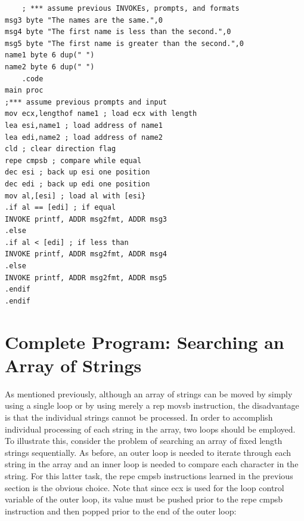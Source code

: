 \documentclass[10pt]{book}
\begin{document}
\begin{verbatim}
    ; *** assume previous INVOKEs, prompts, and formats
msg3 byte "The names are the same.",0
msg4 byte "The first name is less than the second.",0
msg5 byte "The first name is greater than the second.",0
name1 byte 6 dup(" ")
name2 byte 6 dup(" ")
    .code
main proc
;*** assume previous prompts and input
mov ecx,lengthof name1 ; load ecx with length
lea esi,name1 ; load address of name1
lea edi,name2 ; load address of name2
cld ; clear direction flag
repe cmpsb ; compare while equal
dec esi ; back up esi one position
dec edi ; back up edi one position
mov al,[esi] ; load al with [esi}
.if al == [edi] ; if equal
INVOKE printf, ADDR msg2fmt, ADDR msg3
.else
.if al < [edi] ; if less than
INVOKE printf, ADDR msg2fmt, ADDR msg4
.else
INVOKE printf, ADDR msg2fmt, ADDR msg5
.endif
.endif
\end{verbatim}

\section{Complete Program: Searching an Array of Strings}
As mentioned previously, although an array of strings can be moved by simply using a single loop or by using merely a rep movsb instruction, the disadvantage is that the individual strings cannot be processed. In order to accomplish individual processing of each string in the array, two loops should be employed. To illustrate this, consider the problem of searching an array of fixed length strings sequentially. As before, an outer loop is needed to iterate through each string in the array and an inner loop is needed to compare each character in the string. For this latter task, the repe cmpsb instructions learned in the previous section is the obvious choice. Note that since ecx is used for the loop control variable of the outer loop, its value must be pushed prior to the repe cmpsb instruction and then popped prior to the end of the outer loop:
\end{document}
